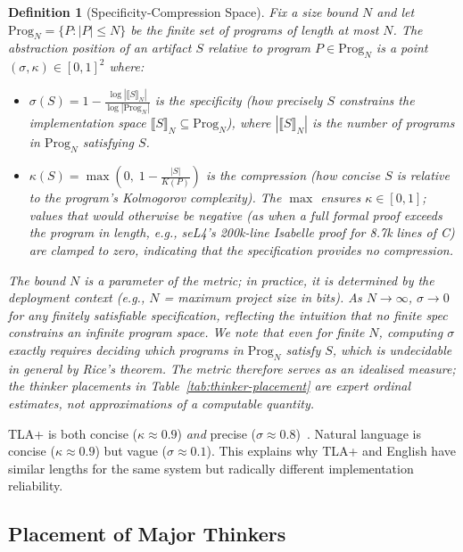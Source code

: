 \documentclass[11pt, a4paper, logo, copyright]{googledeepmind}
\newtheorem{definition}{Definition}[section]
\begin{document}
\begin{definition}[Specificity-Compression Space]
Fix a size bound $N$ and let $\text{Prog}_N = \{P : |P| \leq N\}$ be the finite set of programs of length at most $N$. The \emph{abstraction position} of an artifact $S$ relative to program $P \in \text{Prog}_N$ is a point $(\sigma, \kappa) \in [0,1]^2$ where:
\begin{itemize}
    \item $\sigma(S) = 1 - \frac{\log |\llbracket S \rrbracket_N|}{\log |\text{Prog}_N|}$ is the \emph{specificity} (how precisely $S$ constrains the implementation space $\llbracket S \rrbracket_N \subseteq \text{Prog}_N$), where $|\llbracket S \rrbracket_N|$ is the number of programs in $\text{Prog}_N$ satisfying $S$.
    \item $\kappa(S) = \max\!\left(0,\; 1 - \frac{|S|}{K(P)}\right)$ is the \emph{compression} (how concise $S$ is relative to the program's Kolmogorov complexity). The $\max$ ensures $\kappa \in [0,1]$; values that would otherwise be negative (as when a full formal proof exceeds the program in length, e.g., seL4's 200k-line Isabelle proof for 8.7k lines of C) are clamped to zero, indicating that the specification provides no compression.
\end{itemize}
The bound $N$ is a parameter of the metric; in practice, it is determined by the deployment context (e.g., $N$ = maximum project size in bits). As $N \to \infty$, $\sigma \to 0$ for any finitely satisfiable specification, reflecting the intuition that no finite spec constrains an infinite program space. We note that even for finite $N$, computing $\sigma$ exactly requires deciding which programs in $\text{Prog}_N$ satisfy $S$, which is undecidable in general by Rice's theorem. The metric therefore serves as an idealised measure; the thinker placements in Table~\ref{tab:thinker-placement} are expert ordinal estimates, not approximations of a computable quantity.
\end{definition}

TLA+ is both concise ($\kappa \approx 0.9$) \emph{and} precise ($\sigma \approx 0.8$)~\citep{newcombe2015amazon}. Natural language is concise ($\kappa \approx 0.9$) but vague ($\sigma \approx 0.1$). This explains why TLA+ and English have similar lengths for the same system but radically different implementation reliability.

\subsection{Placement of Major Thinkers}
\end{document}
